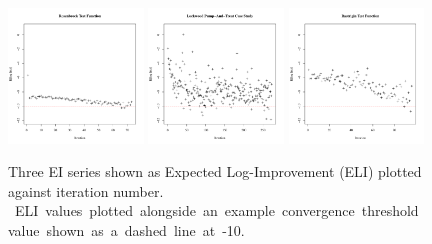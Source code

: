 \documentclass[12pt]{article}
\begin{document}
\clearpage
%
%
\begin{figure}
\includegraphics[width=0.32\textwidth]{./figures/introChartRoseEasyEasyAxis.pdf}
\includegraphics[width=0.32\textwidth]{./figures/introChartLock6Three20000Axis.pdf}
\includegraphics[width=0.32\textwidth]{./figures/introChartRastHardAxis.pdf}
\caption{
%
Three EI series shown as Expected Log-Improvement {\color{red}(ELI)} plotted against iteration number.
 \mbox{{\color{red} ELI} values plotted alongside an example convergence threshold value shown as a dashed line at -10.}
}
\label{introFig}
\end{figure}
%
%
\end{document}
